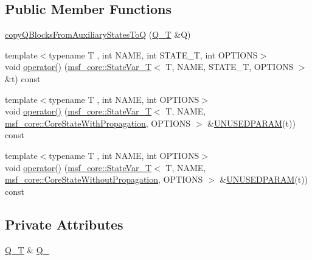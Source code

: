 \subsection*{Public Member Functions}
\begin{DoxyCompactItemize}
\item 
\hyperlink{structmsf__tmp_1_1copyQBlocksFromAuxiliaryStatesToQ_a7a9ed4001d97b216f44afa8990fa0e8b}{copy\-Q\-Blocks\-From\-Auxiliary\-States\-To\-Q} (\hyperlink{structmsf__tmp_1_1copyQBlocksFromAuxiliaryStatesToQ_ae129639a59b673f01724af984fde8c2c}{Q\-\_\-\-T} \&Q)
\item 
{\footnotesize template$<$typename T , int N\-A\-M\-E, int S\-T\-A\-T\-E\-\_\-\-T, int O\-P\-T\-I\-O\-N\-S$>$ }\\void \hyperlink{structmsf__tmp_1_1copyQBlocksFromAuxiliaryStatesToQ_afeaa6786a0587a3737d69b3fa7f8de24}{operator()} (\hyperlink{structmsf__core_1_1StateVar__T}{msf\-\_\-core\-::\-State\-Var\-\_\-\-T}$<$ T, N\-A\-M\-E, S\-T\-A\-T\-E\-\_\-\-T, O\-P\-T\-I\-O\-N\-S $>$ \&t) const 
\item 
{\footnotesize template$<$typename T , int N\-A\-M\-E, int O\-P\-T\-I\-O\-N\-S$>$ }\\void \hyperlink{structmsf__tmp_1_1copyQBlocksFromAuxiliaryStatesToQ_a5cc910e367658a8d0e8439368a96327f}{operator()} (\hyperlink{structmsf__core_1_1StateVar__T}{msf\-\_\-core\-::\-State\-Var\-\_\-\-T}$<$ T, N\-A\-M\-E, \hyperlink{namespacemsf__core_a7250e8c11f743373771fc229011ae788a0c9bb148eede8a7954b42003c28db10b}{msf\-\_\-core\-::\-Core\-State\-With\-Propagation}, O\-P\-T\-I\-O\-N\-S $>$ \&\hyperlink{msf__macros_8h_a2d2af1048de7b1510994ffd3bc32aacc}{U\-N\-U\-S\-E\-D\-P\-A\-R\-A\-M}(t)) const 
\item 
{\footnotesize template$<$typename T , int N\-A\-M\-E, int O\-P\-T\-I\-O\-N\-S$>$ }\\void \hyperlink{structmsf__tmp_1_1copyQBlocksFromAuxiliaryStatesToQ_abf3a1052628ff5e611a94115bfba7d47}{operator()} (\hyperlink{structmsf__core_1_1StateVar__T}{msf\-\_\-core\-::\-State\-Var\-\_\-\-T}$<$ T, N\-A\-M\-E, \hyperlink{namespacemsf__core_a7250e8c11f743373771fc229011ae788adeecad6ca6b649385e01284db731a939}{msf\-\_\-core\-::\-Core\-State\-Without\-Propagation}, O\-P\-T\-I\-O\-N\-S $>$ \&\hyperlink{msf__macros_8h_a2d2af1048de7b1510994ffd3bc32aacc}{U\-N\-U\-S\-E\-D\-P\-A\-R\-A\-M}(t)) const 
\end{DoxyCompactItemize}
\subsection*{Private Attributes}
\begin{DoxyCompactItemize}
\item 
\hyperlink{structmsf__tmp_1_1copyQBlocksFromAuxiliaryStatesToQ_ae129639a59b673f01724af984fde8c2c}{Q\-\_\-\-T} \& \hyperlink{structmsf__tmp_1_1copyQBlocksFromAuxiliaryStatesToQ_afb787eb533fffa04c048d9d956187f86}{Q\-\_\-}
\end{DoxyCompactItemize}


